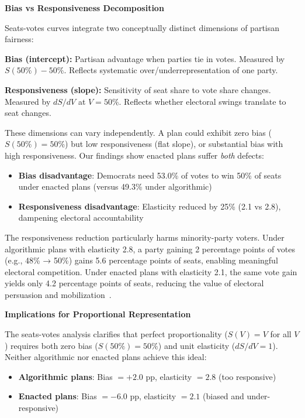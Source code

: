 \textbf{Bias vs Responsiveness Decomposition}

Seats-votes curves integrate two conceptually distinct dimensions of partisan fairness:

\textbf{Bias (intercept):} Partisan advantage when parties tie in votes. Measured by $S(50\%) - 50\%$. Reflects systematic over/underrepresentation of one party.

\textbf{Responsiveness (slope):} Sensitivity of seat share to vote share changes. Measured by $dS/dV$ at $V=50\%$. Reflects whether electoral swings translate to seat changes.

These dimensions can vary independently. A plan could exhibit zero bias ($S(50\%) = 50\%$) but low responsiveness (flat slope), or substantial bias with high responsiveness. Our findings show enacted plans suffer \emph{both} defects:

\begin{itemize}
    \item \textbf{Bias disadvantage}: Democrats need 53.0\% of votes to win 50\% of seats under enacted plans (versus 49.3\% under algorithmic)
    \item \textbf{Responsiveness disadvantage}: Elasticity reduced by 25\% (2.1 vs 2.8), dampening electoral accountability
\end{itemize}

The responsiveness reduction particularly harms minority-party voters. Under algorithmic plans with elasticity 2.8, a party gaining 2 percentage points of votes (e.g., 48\% → 50\%) gains 5.6 percentage points of seats, enabling meaningful electoral competition. Under enacted plans with elasticity 2.1, the same vote gain yields only 4.2 percentage points of seats, reducing the value of electoral persuasion and mobilization~\cite{gelman1990bias}.

\textbf{Implications for Proportional Representation}

The seats-votes analysis clarifies that perfect proportionality ($S(V) = V$ for all $V$) requires both zero bias ($S(50\%) = 50\%$) and unit elasticity ($dS/dV = 1$). Neither algorithmic nor enacted plans achieve this ideal:

\begin{itemize}
    \item \textbf{Algorithmic plans}: Bias $= +2.0$ pp, elasticity $= 2.8$ (too responsive)
    \item \textbf{Enacted plans}: Bias $= -6.0$ pp, elasticity $= 2.1$ (biased and under-responsive)
\end{itemize}

